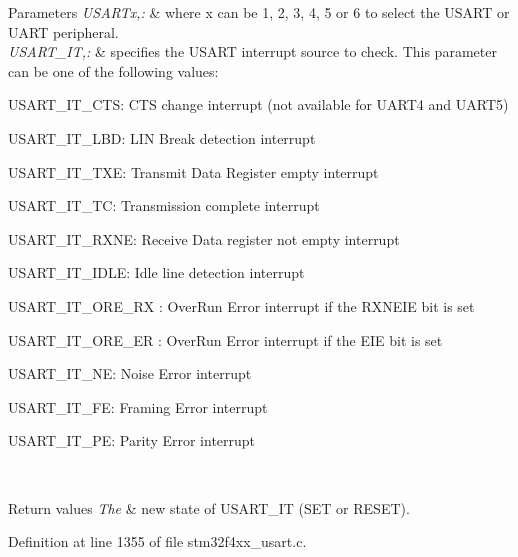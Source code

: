 \begin{DoxyParams}{Parameters}
{\em U\-S\-A\-R\-Tx,\-:} & where x can be 1, 2, 3, 4, 5 or 6 to select the U\-S\-A\-R\-T or U\-A\-R\-T peripheral. \\
\hline
{\em U\-S\-A\-R\-T\-\_\-\-I\-T,\-:} & specifies the U\-S\-A\-R\-T interrupt source to check. This parameter can be one of the following values\-: \begin{DoxyItemize}
\item U\-S\-A\-R\-T\-\_\-\-I\-T\-\_\-\-C\-T\-S\-: C\-T\-S change interrupt (not available for U\-A\-R\-T4 and U\-A\-R\-T5) \item U\-S\-A\-R\-T\-\_\-\-I\-T\-\_\-\-L\-B\-D\-: L\-I\-N Break detection interrupt \item U\-S\-A\-R\-T\-\_\-\-I\-T\-\_\-\-T\-X\-E\-: Transmit Data Register empty interrupt \item U\-S\-A\-R\-T\-\_\-\-I\-T\-\_\-\-T\-C\-: Transmission complete interrupt \item U\-S\-A\-R\-T\-\_\-\-I\-T\-\_\-\-R\-X\-N\-E\-: Receive Data register not empty interrupt \item U\-S\-A\-R\-T\-\_\-\-I\-T\-\_\-\-I\-D\-L\-E\-: Idle line detection interrupt \item U\-S\-A\-R\-T\-\_\-\-I\-T\-\_\-\-O\-R\-E\-\_\-\-R\-X \-: Over\-Run Error interrupt if the R\-X\-N\-E\-I\-E bit is set \item U\-S\-A\-R\-T\-\_\-\-I\-T\-\_\-\-O\-R\-E\-\_\-\-E\-R \-: Over\-Run Error interrupt if the E\-I\-E bit is set \item U\-S\-A\-R\-T\-\_\-\-I\-T\-\_\-\-N\-E\-: Noise Error interrupt \item U\-S\-A\-R\-T\-\_\-\-I\-T\-\_\-\-F\-E\-: Framing Error interrupt \item U\-S\-A\-R\-T\-\_\-\-I\-T\-\_\-\-P\-E\-: Parity Error interrupt \end{DoxyItemize}
\\
\hline
\end{DoxyParams}

\begin{DoxyRetVals}{Return values}
{\em The} & new state of U\-S\-A\-R\-T\-\_\-\-I\-T (S\-E\-T or R\-E\-S\-E\-T). \\
\hline
\end{DoxyRetVals}


Definition at line 1355 of file stm32f4xx\-\_\-usart.\-c.

